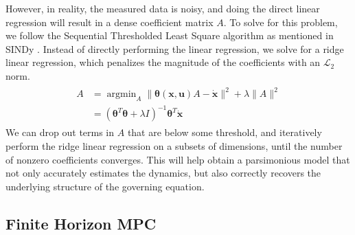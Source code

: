 \documentclass[10pt,twocolumn]{article}
\DeclareMathOperator*{\argmin}{argmin}
\begin{document}
However, in reality, the measured data is noisy, and doing the direct linear regression
will result in a dense coefficient matrix $A$. To solve for this problem, we follow
the Sequential Thresholded Least Square algorithm as mentioned in SINDy \cite{sindy}.
Instead of directly performing the linear regression, we solve for a ridge linear regression,
which penalizes the magnitude of the coefficients with an $\mathcal{L}_2$ norm.
\begin{gather}\label{eqa:ridge_regression}
  \begin{aligned}
    A &= \argmin_A \| \bm{\theta}(\bm{x}, \bm{u})A - \dot{\bm{x}} \|^2 + \lambda \| A \|^2 \\
      &= (\bm{\theta}^T \bm{\theta} + \lambda I)^{-1}\bm{\theta}^T \dot{\bm{x}}
  \end{aligned}
\end{gather}
We can drop out terms in $A$ that are below some threshold, and iteratively perform the
ridge linear regression on a subsets of dimensions, until the number of nonzero coefficients
converges. This will help obtain a parsimonious model that not only accurately estimates the
dynamics, but also correctly recovers the underlying structure of the governing equation.

\subsection{Finite Horizon MPC}\label{sec:mpc}
\end{document}
